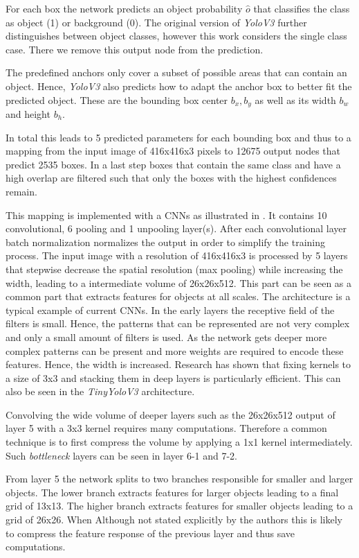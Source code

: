 	For each box the network predicts an object probability $\hat o$ that classifies the class as object (1) or background (0). The original version of \textit{YoloV3} further distinguishes between object classes, however this work considers the single class case. There we remove this output node from the prediction. 
	
	The predefined anchors only cover a subset of possible areas that can contain an object. Hence, \textit{YoloV3} also predicts how to adapt the anchor box to better fit the predicted object. These are  the bounding box center $b_x,b_y$ as well as its width $b_w$ and height $b_h$. 
		
	In total this leads to 5 predicted parameters for each bounding box and thus to a mapping from the input image of 416x416x3 pixels to 12675 output nodes that predict 2535 boxes. In a last step boxes that contain the same class and have a high overlap are filtered such that only the boxes with the highest confidences remain.	
			
	This mapping is implemented with a \acp{CNN} as illustrated in  . It contains 10 convolutional, 6 pooling and 1 unpooling layer(s). After each convolutional layer batch normalization normalizes the output in order to simplify the training process.
	The input image with a resolution of 416x416x3 is processed by 5 layers that stepwise decrease the spatial resolution (max pooling) while increasing the width, leading to a intermediate volume of 26x26x512. This part can be seen as a common part that extracts features for objects at all scales. The architecture is a typical example of current \acp{CNN}. In the early layers the receptive field of the filters is small. Hence, the patterns that can be represented are not very complex and only a small amount of filters is used. As the network gets deeper more complex patterns can be present and more weights are required to encode these features. Hence, the width is increased. Research has shown that fixing kernels to a size of 3x3 and stacking them in deep layers is particularly efficient. This can also be seen in the \textit{TinyYoloV3} architecture. 
	
	Convolving the wide volume of deeper layers such as the 26x26x512  output of layer 5 with a 3x3 kernel requires many computations. Therefore a common technique is to first compress the volume by applying a 1x1 kernel intermediately. Such \textit{bottleneck} layers can be seen in layer 6-1 and 7-2.
	
	From layer 5 the network splits to two branches responsible for smaller and larger objects. The lower branch extracts features for larger objects leading to a final grid of 13x13. The higher branch extracts features for smaller objects leading to a grid of 26x26. When Although not stated explicitly by the authors this is likely to compress the feature response of the previous layer and thus save computations.
	
